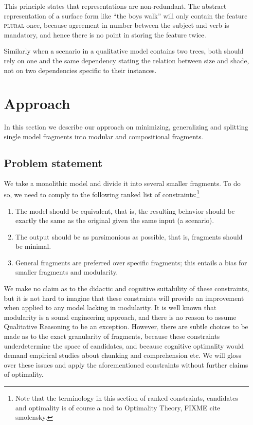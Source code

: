 \documentclass{article} %
\begin{document}
\begin{itemize}
	This principle states that representations are non-redundant. The
	abstract representation of a surface form like ``the boys walk'' will
	only contain the feature \textsc{plural} once, because agreement in
	number between the subject and verb is mandatory, and hence there is
	no point in storing the feature twice. 

	Similarly when a scenario in a qualitative model contains two trees,
	both should rely on one and the same dependency stating the relation
	between size and shade, not on two dependencies specific to their
	instances. 

\end{itemize}

\section{Approach}

In this section we describe our approach on minimizing, generalizing and
splitting single model fragments into modular and compositional fragments.


\subsection{Problem statement}

We take a monolithic model and divide it into several smaller fragments. To do
so, we need to comply to the following ranked list of
constraints:\footnote{Note that the terminology in this section of ranked
constraints, candidates and optimality is of course a nod to Optimality
Theory, FIXME cite smolensky.}

\begin{enumerate}
\item The model should be equivalent, that is, the resulting behavior should
	be exactly the same as the original given the same input (a scenario).

\item The output should be as parsimonious as possible, that is, fragments
	should be minimal.

\item General fragments are preferred over specific fragments; this entails a
	bias for smaller fragments and modularity.

\end{enumerate}

We make no claim as to the didactic and cognitive suitability of these
constraints, but it is not hard to imagine that these constraints will provide
an improvement when applied to any model lacking in modularity. It is well
known that modularity is a sound engineering approach, and there is no reason
to assume Qualitative Reasoning to be an exception. However, there are subtle
choices to be made as to the exact granularity of fragments, because these
constraints underdetermine the space of candidates, and because cognitive
optimality would demand empirical studies about chunking and comprehension
etc. We will gloss over these issues and apply the aforementioned constraints
without further claims of optimality.
\end{document}
